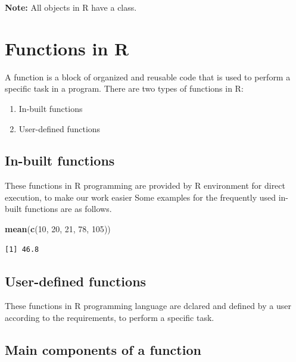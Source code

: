 \documentclass[
]{book}
\newenvironment{Shaded}{\begin{snugshade}}{\end{snugshade}}
\newcommand{\DecValTok}[1]{\textcolor[rgb]{0.00,0.00,0.81}{#1}}
\newcommand{\KeywordTok}[1]{\textcolor[rgb]{0.13,0.29,0.53}{\textbf{#1}}}
\newcommand{\NormalTok}[1]{#1}
\begin{document}
\textbf{Note:} All objects in R have a class.

\hypertarget{function}{%
\chapter{Functions in R}\label{function}}

A function is a block of organized and reusable code that is used to perform a specific task in a program. There are two types of functions in R:

\begin{enumerate}
\def\labelenumi{\arabic{enumi}.}
\item
  In-built functions
\item
  User-defined functions
\end{enumerate}

\hypertarget{in-built-functions}{%
\section{In-built functions}\label{in-built-functions}}

These functions in R programming are provided by R environment for direct execution, to make our work easier Some examples for the frequently used in-built functions are as follows.

\begin{Shaded}
\begin{Highlighting}[]
\KeywordTok{mean}\NormalTok{(}\KeywordTok{c}\NormalTok{(}\DecValTok{10}\NormalTok{, }\DecValTok{20}\NormalTok{, }\DecValTok{21}\NormalTok{, }\DecValTok{78}\NormalTok{, }\DecValTok{105}\NormalTok{))}
\end{Highlighting}
\end{Shaded}

\begin{verbatim}
[1] 46.8
\end{verbatim}

\hypertarget{user-defined-functions}{%
\section{User-defined functions}\label{user-defined-functions}}

These functions in R programming language are dclared and defined by a user according to the requirements, to perform a specific task.

\hypertarget{main-components-of-a-function}{%
\section{Main components of a function}\label{main-components-of-a-function}}
\end{document}
